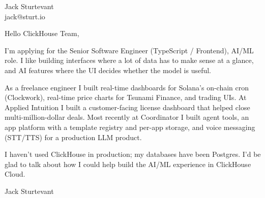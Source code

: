 \documentclass[11pt]{article}
\begin{document}
\raggedright

{\namefont\fontsize{20pt}{24pt}\selectfont Jack Sturtevant}\\[-0.3em]
jack@sturt.io

\vspace{1.2em}

Hello ClickHouse Team,

I'm applying for the Senior Software Engineer (TypeScript / Frontend), AI/ML role. I like building interfaces where a lot of data has to make sense at a glance, and AI features where the UI decides whether the model is useful.

As a freelance engineer I built real-time dashboards for Solana's on-chain cron (Clockwork), real-time price charts for Tsunami Finance, and trading UIs. At Applied Intuition I built a customer-facing license dashboard that helped close multi-million-dollar deals. Most recently at Coordinator I built agent tools, an app platform with a template registry and per-app storage, and voice messaging (STT/TTS) for a production LLM product.

I haven't used ClickHouse in production; my databases have been Postgres. I'd be glad to talk about how I could help build the AI/ML experience in ClickHouse Cloud.

\vspace{0.6em}
Jack Sturtevant
\end{document}

